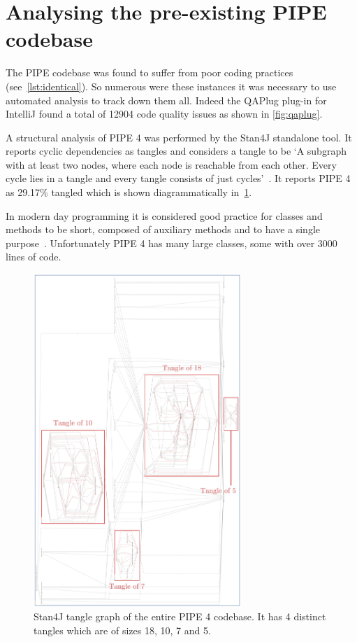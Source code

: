  \section{Analysing the pre-existing PIPE codebase}
The PIPE codebase was found to suffer from poor coding practices (see~\cref{lst:identical}). So numerous were these instances it was necessary to use automated analysis to track down them all. Indeed the QAPlug plug-in for IntelliJ found a total of \num{12904} code quality issues as shown in \cref{fig:qaplug}.

A structural analysis of PIPE 4 was performed by the Stan4J standalone tool. It reports cyclic dependencies as tangles and considers a tangle to be `A subgraph with at least two nodes, where each node is reachable from each other. Every cycle lies in a tangle and every tangle consists of just cycles'~\cite{stan_whitepaper}. It reports PIPE 4 as 29.17\% tangled which is shown diagrammatically in~\cref{fig:tangle}.

In modern day programming it is considered good practice for classes and methods to be short, composed of auxiliary methods and to have a single purpose~\cite{so_can_a_function_be_too_short}. Unfortunately PIPE 4 has many large classes, some with over \num{3000} lines of code. 





\begin{figure}[tb]
\begin{center}
    \includegraphics[width=0.7\textwidth]{analysis/tangle_annotated.png} 
    \caption{Stan4J tangle graph of the entire PIPE 4 codebase. It has 4 distinct tangles which are of sizes 18, 10, 7 and 5.}
    \label{fig:tangle}
\end{center}
\end{figure}